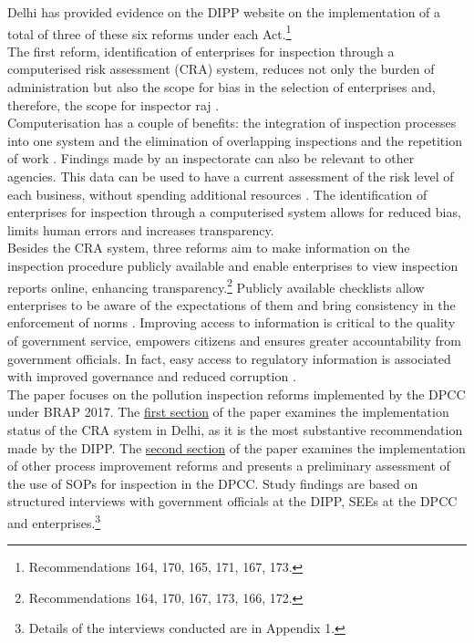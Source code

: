 \documentclass[a4paper, 12pt, twoside]{article}
\begin{document}
                 Delhi has provided evidence on the DIPP website on the implementation of a total of three of these six reforms under each Act.\footnote{Recommendations 164, 170, 165, 171, 167, 173.} \\
                 
                 The first reform, identification of enterprises for inspection through a computerised risk assessment (CRA) system, reduces not only the burden of administration \parencite{DIPPd} but also the scope for bias in the selection of enterprises and, therefore, the scope for inspector raj \parencite{livemintnews}. \\
                 
                 Computerisation has a couple of benefits: the integration of inspection processes into one system and the elimination of overlapping inspections and the repetition of work \parencite{PWC}. Findings made by an inspectorate can also be relevant to other agencies. This data can be used to have a current assessment of the risk level of each business, without spending additional resources \parencite{OECD14}. The identification of enterprises for inspection through a computerised system allows for reduced bias, limits human errors and increases transparency. \\
                 
                 Besides the CRA system, three reforms aim to make information on the inspection procedure publicly available and enable enterprises to view inspection reports online, enhancing transparency.\footnote{Recommendations 164, 170, 167, 173, 166, 172.} Publicly available checklists allow enterprises to be aware of the expectations of them and bring consistency in the enforcement of norms \parencite{blancflorentin}. Improving access to information is critical to the quality of government service, empowers citizens and ensures greater accountability from government officials. In fact, easy access to regulatory information is associated with improved governance and reduced corruption \parencite{Saltane}. \\
                 
                 The paper focuses on the pollution inspection reforms implemented by the DPCC under BRAP 2017. The \hyperref[sec:1]{first section} of the paper examines the implementation status of the CRA system in Delhi, as it is the most substantive recommendation made by the DIPP. The \hyperref[sec:2]{second section} of the paper examines the implementation of other process improvement reforms and presents a preliminary assessment of the use of SOPs for inspection in the DPCC. Study findings are based on structured interviews with government officials at the DIPP, SEEs at the DPCC and enterprises.\footnote{Details of the interviews conducted are in Appendix 1.} 
                 
\end{document}
